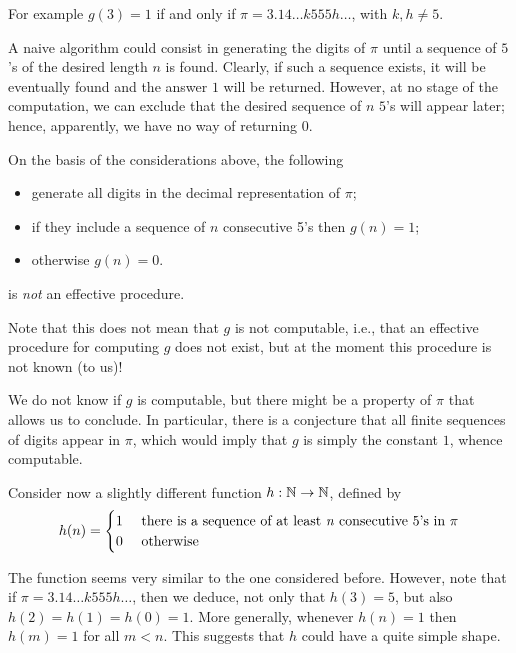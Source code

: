 For example $g(3) = 1$ if and only if  $\pi = 3.14 \dots k 555 h \dots $, with $k, h \neq 5$.

A naive algorithm could consist in generating the digits of $\pi$ until a sequence of $5$'s of the desired length $n$ is found.
Clearly, if such a sequence exists, it will be eventually found and the answer $1$ will be returned. 
However, at no stage of the computation, we can exclude that the desired sequence of $n$ $5$'s will appear later; hence, apparently, we have no way of returning $0$.

\begin{remark}
  On the basis of the considerations above, the following
   \begin{itemize}
   \item generate all digits in the decimal representation of $\pi$;
   \item if they include a sequence of $n$ consecutive 5's then
    $g(n) = 1$;
  \item otherwise $g(n) = 0$.
\end{itemize}
is \emph{not} an effective procedure.
\end{remark}

Note that this does not mean that $g$ is not computable, i.e., that an
effective procedure for computing $g$ does not exist, but at the moment this procedure is not known (to us)!

We do not know if $g$ is computable, but there might be a property
of $\pi$ that allows us to conclude. In particular, there is a conjecture that all
finite sequences of digits appear in $\pi$, which would imply that $g$
is simply the constant $1$, whence computable.

\medskip

Consider now a slightly different function $h: \mathbb{N} \to \mathbb{N}$, defined by
\begin{equation*}
  h(n) = \begin{cases}
    1 & $ there is a sequence of at least  \textit{n} consecutive $5$'s in $ \pi \\
    0 & $ otherwise $
  \end{cases}
\end{equation*}

The function seems very similar to the one considered before. However, note that if $\pi = 3.14 \dots k 555 h \dots $, then we deduce, not only that $h(3)=5$, but also $h(2)=h(1)=h(0)=1$. 
More generally, whenever $h(n) =1$ then $h(m)=1$ for all $m < n$. This suggests that $h$ could have a quite simple shape.

